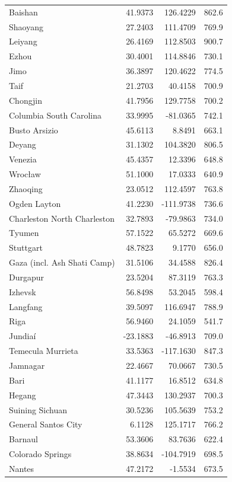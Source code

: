 \begin{longtable}{lrrc}
Baishan & 41.9373 & 126.4229 & 862.6 \\
Shaoyang & 27.2403 & 111.4709 & 769.9 \\
Leiyang & 26.4169 & 112.8503 & 900.7 \\
Ezhou & 30.4001 & 114.8846 & 730.1 \\
Jimo & 36.3897 & 120.4622 & 774.5 \\
Taif & 21.2703 & 40.4158 & 700.9 \\
Chongjin & 41.7956 & 129.7758 & 700.2 \\
Columbia  South Carolina & 33.9995 & -81.0365 & 742.1 \\
Busto Arsizio & 45.6113 & 8.8491 & 663.1 \\
Deyang & 31.1302 & 104.3820 & 806.5 \\
Venezia & 45.4357 & 12.3396 & 648.8 \\
Wrocław & 51.1000 & 17.0333 & 640.9 \\
Zhaoqing & 23.0512 & 112.4597 & 763.8 \\
Ogden Layton & 41.2230 & -111.9738 & 736.6 \\
Charleston North Charleston & 32.7893 & -79.9863 & 734.0 \\
Tyumen & 57.1522 & 65.5272 & 669.6 \\
Stuttgart & 48.7823 & 9.1770 & 656.0 \\
Gaza (incl. Ash Shati Camp) & 31.5106 & 34.4588 & 826.4 \\
Durgapur & 23.5204 & 87.3119 & 763.3 \\
Izhevsk & 56.8498 & 53.2045 & 598.4 \\
Langfang & 39.5097 & 116.6947 & 788.9 \\
Riga & 56.9460 & 24.1059 & 541.7 \\
Jundiaí & -23.1883 & -46.8913 & 709.0 \\
Temecula Murrieta & 33.5363 & -117.1630 & 847.3 \\
Jamnagar & 22.4667 & 70.0667 & 730.5 \\
Bari & 41.1177 & 16.8512 & 634.8 \\
Hegang & 47.3443 & 130.2937 & 700.3 \\
Suining  Sichuan & 30.5236 & 105.5639 & 753.2 \\
General Santos City & 6.1128 & 125.1717 & 766.2 \\
Barnaul & 53.3606 & 83.7636 & 622.4 \\
Colorado Springs & 38.8634 & -104.7919 & 698.5 \\
Nantes & 47.2172 & -1.5534 & 673.5 \\

\end{longtable}
